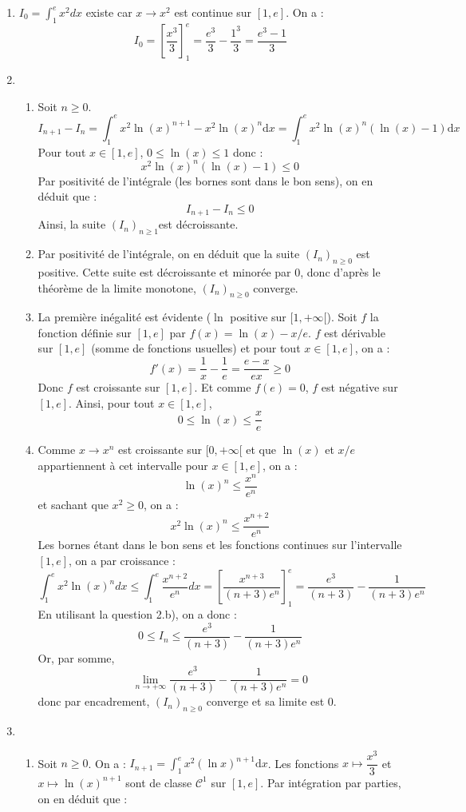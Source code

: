 \documentclass[a4paper,twoside,french,11pt]{VcCours}
\newcommand{\dx}{\text{d}x}
\begin{document}
\begin{Exercice}{}\end{Exercice}
\begin{enumerate}
\item  $  I_{0}=\int_{1}^{e}x^{2} dx$ existe car $x \rightarrow x^2$ est continue sur $[1,e]$. On a :
\[ I_0 = \left[ \frac{x^3}{3} \right]_1^e = \frac{e^3}{3} - \frac{1^3}{3} = \frac{e^3-1}{3} \]

\item 
\begin{enumerate}
\item Soit $n \geq 0$.
$$ I_{n+1}-I_n = \int_{1}^e x^2 \ln (x)^{n+1}- x^2\ln (x)^{n} \dx = \int_1^e x^2 \ln(x)^n (\ln(x)-1) \dx$$
Pour tout $x \in [1,e]$, $0 \leq \ln(x) \leq 1$ donc :
$$  x^2 \ln(x)^n (\ln(x)-1) \leq 0$$
Par positivité de l'intégrale (les bornes sont dans le bon sens), on en déduit que :
$$ I_{n+1}-I_n \leq 0$$
Ainsi, la suite $(I_{n})_{n\ge 1}$est décroissante.

\item Par positivité de l'intégrale, on en déduit que la suite $(I_n)_{n \geq 0}$ est positive. Cette suite est décroissante et minorée par $0$, donc d'après le théorème de la limite monotone, $(I_n)_{n  \geq 0}$ converge.

\item La première inégalité est évidente ($\ln$ positive sur $[1,+\infty[$). Soit $f$ la fonction définie sur $[1,e]$ par $f(x)=\ln (x)-x/e$. $f$ est dérivable sur $[1,e]$ (somme de fonctions usuelles) et pour tout $x \in [1,e]$, on a : 
\[ f'(x)={\frac{1}{x}}-{\frac{1}{e}}={\frac{e-x}{ex}} \geq 0\]
Donc $f$ est croissante sur $[1,e]$. Et comme $f(e)=0$, $f$ est négative sur $[1,e]$. Ainsi, pour tout $x \in [1,e]$, 
$$0 \leq \ln(x) \leq   \frac{x}{e}$$

\item Comme $x\rightarrow x^{n}$ est croissante sur $[0,+\infty [$ et que $\ln (x)$ et $x/e$ appartiennent à cet intervalle pour $x \in [1,e]$, on a :
\[ \ln (x)^{n}\le \frac{x^{n}}{e^{n}}\]
et sachant que $x^2 \geq 0$, on a : 
\[x^{2}\ln (x)^{n}\le \frac{x^{n+2}}{e^{n}}\]
Les bornes étant dans le bon sens et les fonctions continues sur l'intervalle $[1,e]$, on a par croissance :
\[ \int_{1}^{e}x^{2}\ln (x)^{n}dx\le \int_{1}^{e}{\frac{x^{n+2}}{e^{n}}} dx=\left[ {\frac{x^{n+3}}{(n+3)e^{n}}}\right] _{1}^{e}={\frac{e^{3}}{(n+3)}}
-{\frac{1}{(n+3)e^{n}}}\]
En utilisant la question 2.b), on a donc :
\[ 0 \le I_n \leq  {\frac{e^{3}}{(n+3)}}
-{\frac{1}{(n+3)e^{n}}} \]
Or, par somme, 
$$  \lim_{n \rightarrow + \infty} {\frac{e^{3}}{(n+3)}}-{\frac{1}{(n+3)e^{n}}} = 0$$
donc par encadrement, $(I_n)_{n \geq 0}$ converge et sa limite est $0$.
\end{enumerate}
\item 
\begin{enumerate}
\item Soit $n \geq 0$. On a : $I_{n+1}=   \int_{1}^{e}x^{2}(\ln x)^{n+1} \dx$. Les fonctions $x \mapsto \dfrac{x^3}{3}$ et $x \mapsto \ln(x)^{n+1}$ sont de classe $\mathcal{C}^1$ sur $[1,e]$. Par intégration par parties, on en déduit que :


\end{enumerate}
\end{enumerate}
\end{document}
